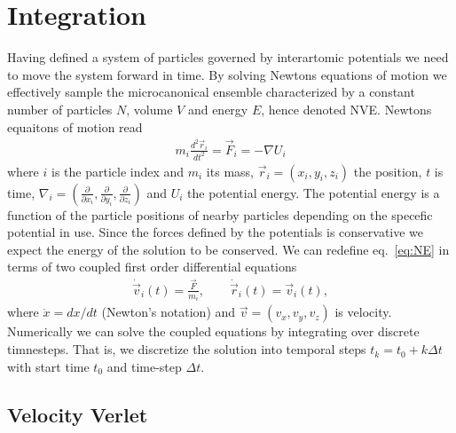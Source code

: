 \section{Integration}

Having defined a system of particles governed by interartomic potentials we need
to move the system forward in time. By solving Newtons equations of motion we
effectively sample the microcanonical ensemble characterized by a
constant number of particles $N$, volume $V$ and energy $E$, hence denoted NVE.
Newtons equaitons of motion read
\begin{align}
  m_i \frac{d^2 \vec{r}_i}{dt^2} = \vec{F}_i = -\nabla U_i
  \label{eq:NE}
\end{align}
where $i$ is the particle index and $m_i$ its mass, $\vec{r}_i = (x_i, y_i,
z_i)$ the position, $t$ is time,  $\nabla_i = (\frac{\partial}{\partial x_i},
\frac{\partial}{\partial y_i}, \frac{\partial}{\partial z_i})$ and $U_i$ the
potential energy. The potential energy is a function of the particle
positions of nearby particles depending on the specefic potential in use. Since
the forces defined by the potentials is conservative we expect the energy of the
solution to be conserved. We can redefine eq.~\eqref{eq:NE} in terms of two coupled
first order differential equations 
\begin{align}
  \dot{\vec{v}}_i(t) = \frac{\vec{F}}{m_i}, \qquad \dot{\vec{r}}_i(t) = \vec{v}_i(t),
  \label{eq:NE_2}
\end{align}
where $\dot{x} = dx/dt$ (Newton's notation) and $\vec{v} = (v_x, v_y, v_z)$ is
velocity. Numerically we can solve the coupled equations by
integrating over discrete timnesteps. That is, we discretize the solution into
temporal steps $t_k = t_0 + k\Delta t$ with start time $t_0$ and time-step $\Delta t$. 



\subsection{Velocity Verlet}

